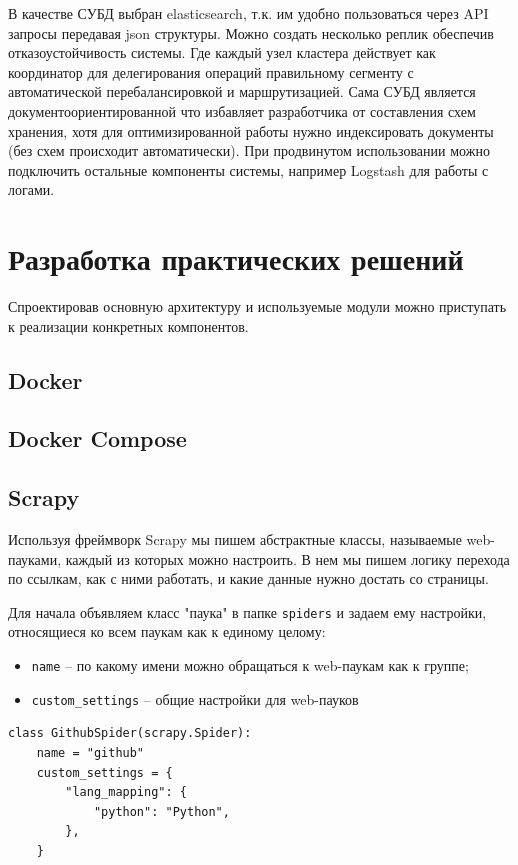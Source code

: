 В качестве СУБД выбран elasticsearch, т.к. им удобно пользоваться через API
запросы передавая json структуры. Можно создать несколько реплик обеспечив
отказоустойчивость системы. Где каждый узел кластера действует как координатор
для делегирования операций правильному сегменту с автоматической
перебалансировкой и маршрутизацией. Сама СУБД является документоориентированной
что избавляет разработчика от составления схем хранения, хотя для
оптимизированной работы нужно индексировать документы (без схем происходит
автоматически). При продвинутом использовании можно подключить остальные
компоненты системы, например Logstash для работы с логами.

\section{Разработка практических решений}
Спроектировав основную архитектуру и используемые модули можно приступать к
реализации конкретных компонентов.

\subsection{Docker}
\subsection{Docker Compose}
\subsection{Scrapy}
Используя фреймворк Scrapy мы пишем абстрактные классы, называемые web-пауками,
каждый из которых можно настроить. В нем мы пишем логику перехода по ссылкам,
как с ними работать, и какие данные нужно достать со страницы.

Для начала объявляем класс "паука" в папке \verb|spiders| и задаем ему
настройки, относящиеся ко всем паукам как к единому целому:
\begin{itemize}
    \item \verb|name| -- по какому имени можно обращаться к web-паукам как к группе;
    \item \verb|custom_settings| -- общие настройки для web-пауков
\end{itemize}

\begin{verbatim}
class GithubSpider(scrapy.Spider):
    name = "github"
    custom_settings = {
        "lang_mapping": {
            "python": "Python",
        },
    }
\end{verbatim}

